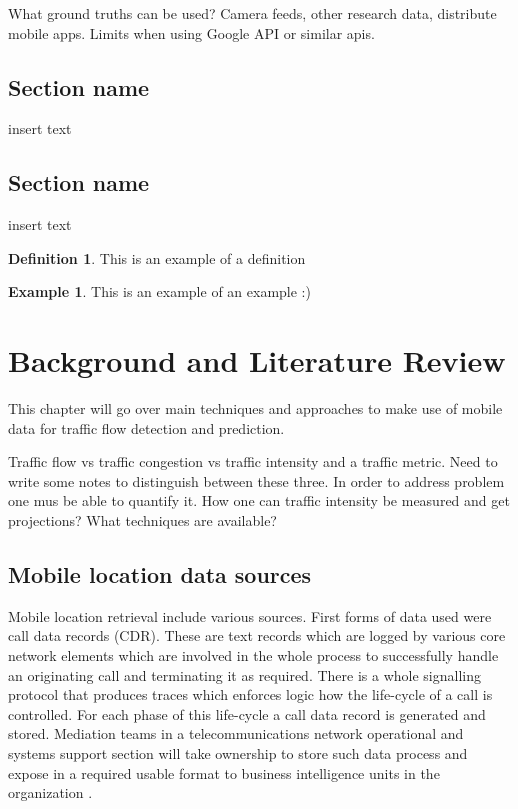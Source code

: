\documentclass[12pt, a4paper]{report}
\theoremstyle{definition}
\newtheorem{definition}{Definition}[section]
\theoremstyle{definition}%
\newtheorem{example}{Example}[section]
\theoremstyle{definition}%
\theoremstyle{definition}%
\theoremstyle{definition}%
\theoremstyle{definition}%
\begin{document}
What ground truths can be used? Camera feeds, other research data, distribute mobile apps.
Limits when using Google API or similar apis.

\section{Section name}
insert text

\section{Section name}
insert text

\begin{definition}
This is an example of a definition
\end{definition}

\begin{example}
This is an example of an example :)
\end{example}


\chapter{Background and Literature Review} \label{background}


This chapter will go over main techniques and approaches to make use of mobile data for traffic flow detection and prediction.

Traffic flow vs traffic congestion vs traffic intensity and a traffic metric.
Need to write some notes to distinguish between these three.
In order to address problem one mus be able to quantify it. How one can traffic intensity be measured and get projections? What techniques are available?

\section{Mobile location data sources} \label{background_mobile_location_data_sources} 

Mobile location retrieval include various sources. First forms of data used were call data records (CDR). These are text records which are logged by various core network elements which are involved in the whole process to successfully handle an originating call and terminating it as required. There is a whole signalling protocol that produces traces which enforces logic how the life-cycle of a call is controlled. For each phase of this life-cycle a call data record is generated and stored. Mediation teams in a telecommunications network operational and systems support section will take ownership to store such data process and expose in a required usable format to business intelligence units in the organization \cite{Liu2014}.
\end{document}
